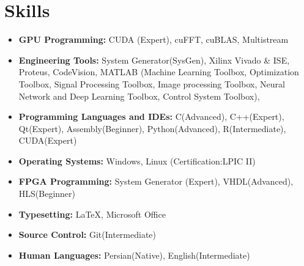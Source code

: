 \section{Skills}
\begin{itemize}
        \setlength\itemsep{0pt}
        \item[]	{\bf GPU Programming:} CUDA (Expert), cuFFT, cuBLAS, Multistream
        		\item[]	{\bf Engineering Tools:} System Generator(SysGen), Xilinx Vivado \& ISE, Proteus, CodeVision, MATLAB (Machine Learning Toolbox, Optimization Toolbox, Signal Processing Toolbox, Image processing Toolbox, Neural Network and Deep Learning Toolbox, Control System Toolbox),
		\item[]	{\bf Programming Languages and IDEs:} C(Advanced), C++(Expert), Qt(Expert), Assembly(Beginner), Python(Advanced), R(Intermediate), CUDA(Expert)
		\item[]	{\bf Operating Systems:} Windows, Linux (Certification:LPIC II)		
        \item[]	{\bf FPGA Programming:} System Generator (Expert), VHDL(Advanced), HLS(Beginner)
		\item[]	{\bf Typesetting:} \LaTeX, Microsoft Office
 	\item[]	{\bf Source Control:} Git(Intermediate) 
    		\item[] {\bf Human Languages:} Persian(Native), English(Intermediate)
\end{itemize}